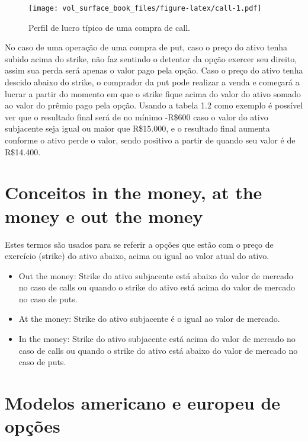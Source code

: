\documentclass[]{book}
\providecommand{\tightlist}{%
  \setlength{\itemsep}{0pt}\setlength{\parskip}{0pt}}
\begin{document}
\begin{figure}
\centering
\texttt{[image: vol\_surface\_book\_files/figure-latex/call-1.pdf]}
\caption{\label{fig:call}Perfil de lucro típico de uma compra de call.}
\end{figure}

No caso de uma operação de uma compra de put, caso o preço do ativo
tenha subido acima do strike, não faz sentindo o detentor da opção
exercer seu direito, assim sua perda será apenas o valor pago pela
opção. Caso o preço do ativo tenha descido abaixo do strike, o comprador
da put pode realizar a venda e começará a lucrar a partir do momento em
que o strike fique acima do valor do ativo somado ao valor do prêmio
pago pela opção. Usando a tabela 1.2 como exemplo é possível ver que o
resultado final será de no mínimo -R\$600 caso o valor do ativo
subjacente seja igual ou maior que R\$15.000, e o resultado final
aumenta conforme o ativo perde o valor, sendo positivo a partir de
quando seu valor é de R\$14.400.

\section{Conceitos in the money, at the money e out the
money}\label{conceitos-in-the-money-at-the-money-e-out-the-money}

Estes termos são usados para se referir a opções que estão com o preço
de exercício (strike) do ativo abaixo, acima ou igual ao valor atual do
ativo.

\begin{itemize}
\tightlist
\item
  Out the money: Strike do ativo subjacente está abaixo do valor de
  mercado no caso de calls ou quando o strike do ativo está acima do
  valor de mercado no caso de puts.\\
\item
  At the money: Strike do ativo subjacente é o igual ao valor de
  mercado.
\item
  In the money: Strike do ativo subjacente está acima do valor de
  mercado no caso de calls ou quando o strike do ativo está abaixo do
  valor de mercado no caso de puts.
\end{itemize}

\section{Modelos americano e europeu de
opções}\label{modelos-americano-e-europeu-de-opcoes}
\end{document}
